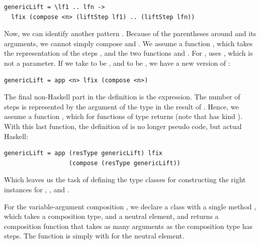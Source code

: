 \documentclass[preprint,natbib]{sigplanconf}
\begin{document}
\begin{small}
\begin{verbatim}
genericLift = \lf1 .. lfn -> 
  lfix (compose <n> (liftStep lf1) .. (liftStep lfn))
\end{verbatim}%
\end{small}

Now, we can identify another pattern . Because of the parentheses around  and its arguments, we cannot simply compose  and . We assume a function , which takes the representation of the steps , and the two functions  and . For ,  uses , which is not a parameter. If we take  to be , and  to be , we have a new version of :

\begin{small}
\begin{verbatim}
genericLift = app <n> lfix (compose <n>)
\end{verbatim}%
\end{small}

The final non-Haskell part in the definition is the  expression. The number of steps is represented by the argument of the  type in the result of . Hence, we assume a function , which for functions of type  returns  (note that  has kind \p{* -> *}). With this last function, the definition of  is no longer pseudo code, but actual Haskell:

\begin{small}
\begin{verbatim}
genericLift = app (resType genericLift) lfix 
                  (compose (resType genericLift))
\end{verbatim}%
\end{small}

Which leaves us the task of defining the type classes  for constructing the right instances for , , and .

For the variable-argument composition , we declare a class  with a single method , which takes a composition type, and a neutral element, and returns a composition function that takes as many arguments as the composition type has steps. The function  is simply  with  for the neutral element.
\end{document}

